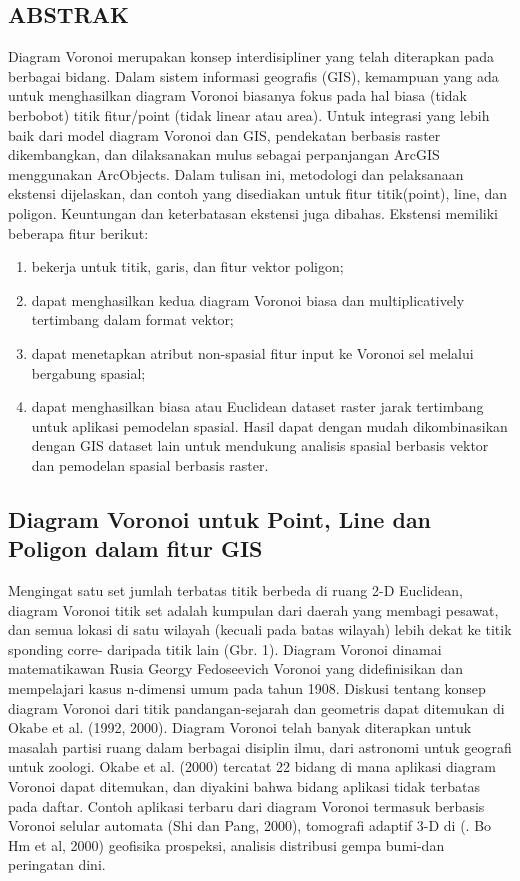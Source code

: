 \subsection{ABSTRAK}
Diagram  Voronoi merupakan konsep interdisipliner yang telah diterapkan pada berbagai bidang. Dalam sistem informasi geografis (GIS), kemampuan yang ada untuk menghasilkan diagram Voronoi biasanya fokus pada hal biasa (tidak berbobot) titik fitur/point (tidak linear atau area). Untuk integrasi yang lebih baik dari model diagram Voronoi dan GIS, pendekatan berbasis raster dikembangkan, dan dilaksanakan mulus sebagai perpanjangan ArcGIS menggunakan ArcObjects. Dalam tulisan ini, metodologi dan pelaksanaan ekstensi dijelaskan, dan contoh yang disediakan untuk fitur titik(point), line, dan poligon. Keuntungan dan keterbatasan ekstensi juga dibahas. Ekstensi memiliki beberapa fitur berikut: 
\begin{enumerate}
\item bekerja untuk titik, garis, dan fitur vektor poligon; 
\item dapat menghasilkan kedua diagram Voronoi biasa dan multiplicatively tertimbang dalam format vektor; 
\item dapat menetapkan atribut non-spasial fitur input ke Voronoi sel melalui bergabung spasial;
\item dapat menghasilkan biasa atau Euclidean dataset raster jarak tertimbang untuk aplikasi pemodelan spasial. Hasil dapat dengan mudah dikombinasikan dengan GIS dataset lain untuk mendukung analisis spasial berbasis vektor dan pemodelan spasial berbasis raster.
\end{enumerate}

\subsection{Diagram Voronoi untuk Point, Line dan Poligon dalam fitur GIS}
	Mengingat satu set jumlah terbatas titik berbeda di ruang 2-D Euclidean, diagram Voronoi titik set adalah kumpulan dari daerah yang membagi pesawat, dan semua lokasi di satu wilayah (kecuali pada batas wilayah) lebih dekat ke titik sponding corre- daripada titik lain (Gbr. 1). Diagram Voronoi dinamai matematikawan Rusia Georgy Fedoseevich Voronoi yang didefinisikan dan mempelajari kasus n-dimensi umum pada tahun 1908. Diskusi tentang konsep diagram Voronoi dari titik pandangan-sejarah dan geometris dapat ditemukan di Okabe et al. (1992, 2000).
	Diagram Voronoi telah banyak diterapkan untuk masalah partisi ruang dalam berbagai disiplin ilmu, dari astronomi untuk geografi untuk zoologi. Okabe et al. (2000) tercatat 22 bidang di mana aplikasi diagram Voronoi dapat ditemukan, dan diyakini bahwa bidang aplikasi tidak terbatas pada daftar. Contoh aplikasi terbaru dari diagram Voronoi termasuk berbasis Voronoi selular automata (Shi dan Pang, 2000), tomografi adaptif 3-D di (. Bo Hm et al, 2000) geofisika prospeksi, analisis distribusi gempa bumi-dan peringatan dini.

